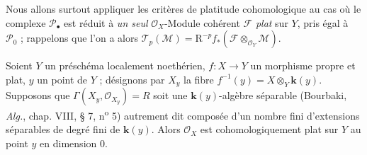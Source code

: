 Nous allons surtout appliquer les critères de platitude cohomologique au cas où
le complexe $\mathscr P_\bullet$ est réduit à \emph{un seul}
$\mathscr O_X$-Module cohérent $\mathscr F$ \emph{plat} sur $Y$, pris égal à
$\mathscr P_0$ ; rappelons que l'on a alors
$\mathscr T_p(\mathscr M)=\mathrm R^{-p}f_*
(\mathscr F\otimes_{\mathscr O_Y}\mathscr M)$.

\begin{proposition}[7.8.6]
Soient $Y$ un préschéma localement noethérien, $f:X\to Y$ un morphisme propre
et plat, $y$ un point de $Y$ ; désignons par $X_y$ la fibre
$f^{-1}(y)=X\otimes_Y\boldsymbol{k}(y)$. Supposons que
$\Gamma(X_y,\mathscr O_{X_y})=R$ soit une $\boldsymbol{k}(y)$-algèbre séparable
\textup{(Bourbaki, \emph{Alg.}, chap. VIII, § 7, n\textsuperscript{o} 5)} autrement dit
composée d'un nombre fini d'extensions séparables de degré fini de $\boldsymbol{k}(y)$.
Alors $\mathscr O_X$ est cohomologiquement plat sur $Y$ au point $y$ en
dimension 0.
\end{proposition}

